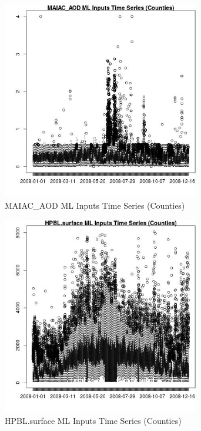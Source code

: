 \begin{figure} 
\centering  
\includegraphics[width=0.77\textwidth]{Code_Outputs/ML_input_report_ML_input_CountyGeometricCentroids_Locations_Dates_part_c_2008-01-01to2008-12-31_MAIAC_AODTS.jpg} 
\caption{\label{fig:ML_input_report_ML_input_CountyGeometricCentroids_Locations_Dates_part_c_2008-01-01to2008-12-31MAIAC_AODTS}MAIAC_AOD ML Inputs Time Series (Counties)} 
\end{figure} 
 

\begin{figure} 
\centering  
\includegraphics[width=0.77\textwidth]{Code_Outputs/ML_input_report_ML_input_CountyGeometricCentroids_Locations_Dates_part_c_2008-01-01to2008-12-31_HPBL.surfaceTS.jpg} 
\caption{\label{fig:ML_input_report_ML_input_CountyGeometricCentroids_Locations_Dates_part_c_2008-01-01to2008-12-31HPBL.surfaceTS}HPBL.surface ML Inputs Time Series (Counties)} 
\end{figure} 
 

